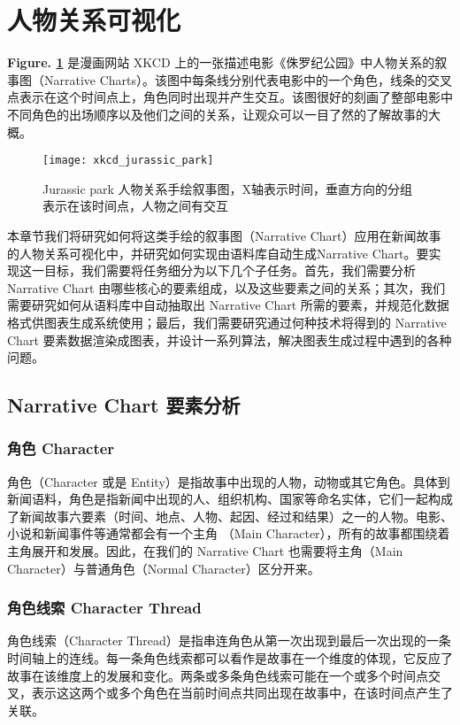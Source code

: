 \section{人物关系可视化}
\textbf{Figure. \ref{xkcd}} 是漫画网站 XKCD 上的一张描述电影《侏罗纪公园》中人物关系的叙事图（Narrative Charts）。该图中每条线分别代表电影中的一个角色，线条的交叉点表示在这个时间点上，角色同时出现并产生交互。该图很好的刻画了整部电影中不同角色的出场顺序以及他们之间的关系，让观众可以一目了然的了解故事的大概。
\begin{figure}[htb]
	\centering
		\texttt{[image: xkcd\_jurassic\_park]}
	\caption{Jurassic park 人物关系手绘叙事图，X轴表示时间，垂直方向的分组表示在该时间点，人物之间有交互}
	\label{xkcd}
\end{figure}

本章节我们将研究如何将这类手绘的叙事图（Narrative Chart）应用在新闻故事的人物关系可视化中，并研究如何实现由语料库自动生成Narrative Chart。要实现这一目标，我们需要将任务细分为以下几个子任务。首先，我们需要分析 Narrative Chart 由哪些核心的要素组成，以及这些要素之间的关系；其次，我们需要研究如何从语料库中自动抽取出 Narrative Chart 所需的要素，并规范化数据格式供图表生成系统使用；最后，我们需要研究通过何种技术将得到的 Narrative Chart 要素数据渲染成图表，并设计一系列算法，解决图表生成过程中遇到的各种问题。

\subsection{Narrative Chart 要素分析}

\subsubsection{角色 Character}
角色（Character 或是 Entity）是指故事中出现的人物，动物或其它角色。具体到新闻语料，角色是指新闻中出现的人、组织机构、国家等命名实体，它们一起构成了新闻故事六要素（时间、地点、人物、起因、经过和结果）之一的人物。电影、小说和新闻事件等通常都会有一个主角 （Main Character），所有的故事都围绕着主角展开和发展。因此，在我们的 Narrative Chart 也需要将主角（Main Character）与普通角色（Normal Character）区分开来。

\subsubsection{角色线索 Character Thread}
角色线索（Character Thread）是指串连角色从第一次出现到最后一次出现的一条时间轴上的连线。每一条角色线索都可以看作是故事在一个维度的体现，它反应了故事在该维度上的发展和变化。两条或多条角色线索可能在一个或多个时间点交叉，表示这这两个或多个角色在当前时间点共同出现在故事中，在该时间点产生了关联。

